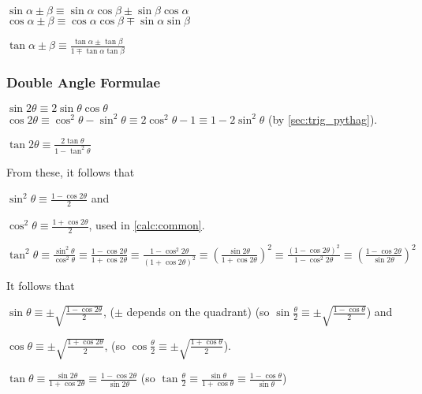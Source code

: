 \documentclass[a4paper,11pt]{article}
\begin{document}
    $\sin \alpha \pm \beta \equiv
       \sin \alpha \cos \beta \pm \sin \beta \cos \alpha$
    \\$\cos \alpha \pm \beta \equiv
       \cos \alpha \cos \beta \mp \sin \alpha \sin \beta$

    $\displaystyle \tan \alpha \pm \beta \equiv
        \frac{\tan \alpha \pm \tan \beta}{1 \mp \tan \alpha \tan \beta}$

    \subsubsection{Double Angle Formulae} \label{sec:trig_double_angle}

    $\sin 2\theta \equiv
       2\sin \theta \cos \theta$
    \\$\cos 2\theta \equiv
       \cos^2 \theta - \sin^2 \theta \equiv
       2\cos^2 \theta - 1 \equiv 1 - 2\sin^2 \theta$ (by \ref{sec:trig_pythag}).

    $\displaystyle \tan 2\theta \equiv
        \frac{2\tan \theta}{1 - \tan^2 \theta}$

    From these, it follows that

    $\displaystyle \sin^2 \theta \equiv
        \frac{1 - \cos 2 \theta} 2$ and

    $\displaystyle \cos^2 \theta \equiv
        \frac{1 + \cos 2 \theta} 2$, used in \ref{calc:common}.

    $\displaystyle \tan^2 \theta \equiv \frac{\sin^2 \theta}{\cos^2 \theta}
        \equiv \frac{1 - \cos 2 \theta}{1 + \cos 2 \theta}
        \equiv \frac{1 - \cos^2 2 \theta}{(1 + \cos 2 \theta)^2}
        \equiv \left(\frac{\sin 2 \theta}{1 + \cos 2 \theta}\right)^2
        \equiv \frac{(1 - \cos 2 \theta)^2}{1 - \cos^2 2 \theta}
        \equiv \left(\frac{1 - \cos 2 \theta}{\sin 2 \theta}\right)^2$

    It follows that

    $\displaystyle \sin \theta \equiv
        \pm\sqrt{\frac{1 - \cos 2 \theta} 2}$, ($\pm$ depends on the quadrant)
    (so $\displaystyle \sin \frac \theta 2 \equiv
        \pm\sqrt{\frac{1 - \cos \theta} 2}$) and

    $\displaystyle \cos \theta \equiv
        \pm\sqrt{\frac{1 + \cos 2 \theta} 2}$, (so
    $\displaystyle \cos \frac \theta 2 \equiv
        \pm\sqrt{\frac{1 + \cos \theta} 2}$).

    $\displaystyle \tan \theta
        \equiv \frac{\sin 2 \theta}{1 + \cos 2 \theta}
        \equiv \frac{1 - \cos 2 \theta}{\sin 2 \theta}$
    (so $\displaystyle \tan \frac \theta 2
        \equiv \frac{\sin \theta}{1 + \cos \theta}
        \equiv \frac{1 - \cos \theta}{\sin \theta}$)
\end{document}
